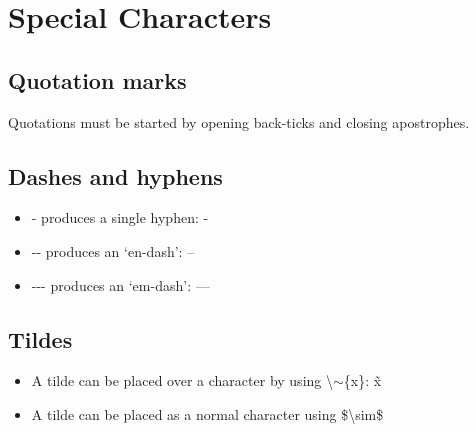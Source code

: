 \section{Special Characters}
\subsection{Quotation marks}
Quotations must be started by opening back-ticks and closing apostrophes.

\subsection{Dashes and hyphens}
\begin{itemize}
\item - produces a single hyphen: -
\item -\mbox{}- produces an `en-dash': --
\item -\mbox{}-\mbox{}- produces an `em-dash': ---
\end{itemize}

\subsection{Tildes}
\begin{itemize}
\item A tilde can be placed over a character by using \textbackslash{}$\sim$\{x\}: \~{x}

\item A tilde can be placed as a normal character using \$\textbackslash{}sim\$
\end{itemize}













